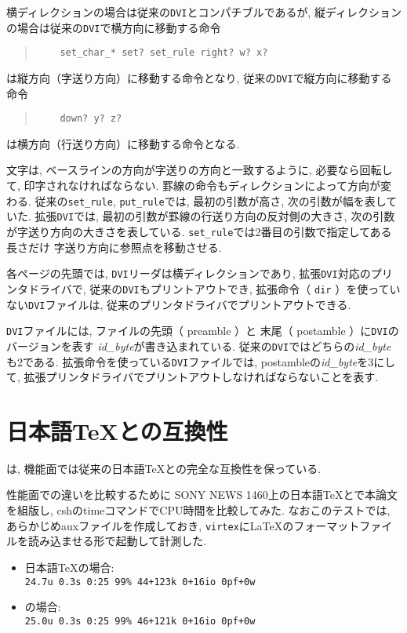 横ディレクションの場合は従来の\verb|DVI|とコンパチブルであるが,
縦ディレクションの場合は従来の\verb|DVI|で横方向に移動する命令
\begin{quote} \begin{verbatim}
	set_char_* set? set_rule right? w? x?
\end{verbatim} \end{quote}
は縦方向（字送り方向）に移動する命令となり,
従来の\verb|DVI|で縦方向に移動する命令
\begin{quote} \begin{verbatim}
	down? y? z?
\end{verbatim} \end{quote}
は横方向（行送り方向）に移動する命令となる.

文字は, ベースラインの方向が字送りの方向と一致するように,
必要なら回転して, 印字されなければならない.
罫線の命令もディレクションによって方向が変わる.
従来の\verb|set_rule|, \verb|put_rule|では,
最初の引数が高さ, 次の引数が幅を表していた.
拡張\verb|DVI|では, 最初の引数が罫線の行送り方向の反対側の大きさ,
次の引数が字送り方向の大きさを表している.
\verb|set_rule|では2番目の引数で指定してある長さだけ
字送り方向に参照点を移動させる.

各ページの先頭では, {\tt DVI}リーダは横ディレクションであり,
拡張\verb|DVI|対応のプリンタドライバで, 従来の\verb|DVI|もプリントアウトでき,
拡張命令（\kern0pt \verb|dir|\kern0pt ）を使っていない\verb|DVI|ファイルは,
従来のプリンタドライバでプリントアウトできる.

\verb|DVI|ファイルには, ファイルの先頭（\kern0pt preamble\kern0pt ）と
末尾（\kern0pt postamble\kern0pt ）に\verb|DVI|のバージョンを表す
{\it id\_byte}が書き込まれている.
従来の\verb|DVI|ではどちらの{\it id\_byte}も2である.
拡張命令を使っている\verb|DVI|ファイルでは, postambleの{\it id\_byte}を3にして,
拡張プリンタドライバでプリントアウトしなければならないことを表す.


\section{日本語\TeX との互換性}

\pTeX は, 機能面では従来の日本語\TeX との完全な互換性を保っている.

性能面での違いを比較するために
SONY NEWS 1460上の日本語\TeX と\pTeX で本論文を組版し,
cshのtimeコマンドでCPU時間を比較してみた.
なおこのテストでは, あらかじめauxファイルを作成しておき,
{\tt virtex}に\LaTeX のフォーマットファイルを読み込ませる形で起動して計測した.
\begin{itemize}
\item 日本語\TeX の場合:\\
	\verb|24.7u 0.3s 0:25 99% 44+123k 0+16io 0pf+0w|

\item \pTeX の場合:\\
	\verb|25.0u 0.3s 0:25 99% 46+121k 0+16io 0pf+0w|
\end{itemize}

